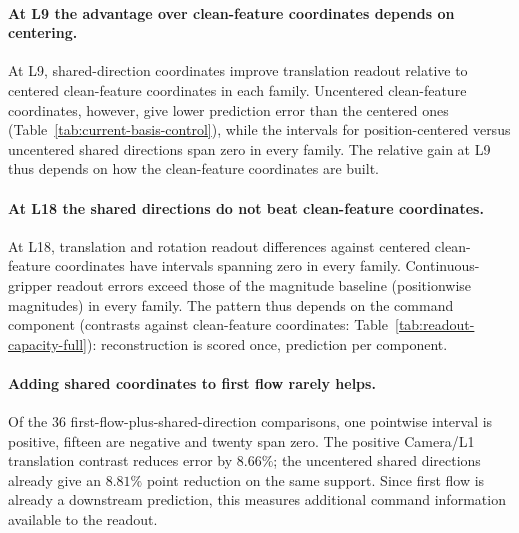 

\paragraph{At L9 the advantage over clean-feature coordinates depends on centering.}
At L9, shared-direction coordinates improve translation readout relative to centered clean-feature coordinates in each family. Uncentered clean-feature coordinates, however, give lower prediction error than the centered ones (Table~\ref{tab:current-basis-control}), while the intervals for position-centered versus uncentered shared directions span zero in every family. The relative gain at L9 thus depends on how the clean-feature coordinates are built.

\paragraph{At L18 the shared directions do not beat clean-feature coordinates.}
At L18, translation and rotation readout differences against centered clean-feature coordinates have intervals spanning zero in every family. Continuous-gripper readout errors exceed those of the magnitude baseline (positionwise magnitudes) in every family. The pattern thus depends on the command component (contrasts against clean-feature coordinates: Table~\ref{tab:readout-capacity-full}): reconstruction is scored once, prediction per component.

\paragraph{Adding shared coordinates to first flow rarely helps.}
Of the 36 first-flow-plus-shared-direction comparisons, one pointwise interval is positive, fifteen are negative and twenty span zero. The positive Camera/L1 translation contrast reduces error by $8.66\%$; the uncentered shared directions already give an $8.81\%$ point reduction on the same support. Since first flow is already a downstream prediction, this measures additional command information available to the readout.

